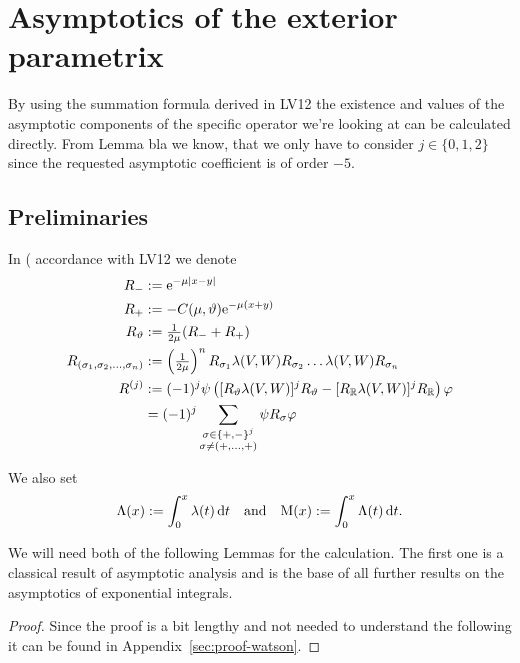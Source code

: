 \section{Asymptotics of the exterior parametrix}
By using the summation formula derived in LV12 the existence and values of the
asymptotic components of the specific operator we're looking at can be
calculated directly. From Lemma bla we know, that we only have to consider $j\in
\{0, 1, 2\}$ since the requested asymptotic coefficient is of order $-5$.

\subsection{Preliminaries}
In (%
accordance with LV12 we denote
\begin{align*}
    R_- &:= \Eto{-\mu\left|x-y\right|} \\
    R_+ &:= -C(\mu,\theta)\Eto{-\mu(x+y)} \\
    R_\theta &:= \tfrac1{2\mu} (R_- + R_+) \\
    R_{(\sigma_1,\sigma_2,\ldots,\sigma_n)} &:= 
    \left(\tfrac1{2\mu}\right)^n R_{\sigma_1} \lambda(V,W) R_{\sigma_2} \dots
    \lambda(V,W) R_{\sigma_n} \\
    R^{(j)} &:= (-1)^j \psi \left( [R_\theta \lambda(V,W)]^j R_\theta -
    [R_\mathbb{R}\lambda(V,W)]^j R_\mathbb{R}\right) \phi \\
            &= (-1)^j
                \sum_{
                        \substack{
                         \sigma\in\{+,-\}^j \\
                         \sigma\neq(+,\ldots,+)
                         }
                        }
                     \psi R_\sigma
                \phi
\end{align*}

We also set
\begin{align}
    \Lambda(x) := \Integ[x]{0}{t}{\lambda(t)}\quad\text{and}\quad
    \mathrm M(x) := \Integ[x]{0}{t}{\Lambda(t)}.
\end{align}

We will need both of the following Lemmas for the calculation. The first one is
a classical result of asymptotic analysis and is the base of all further results
on the asymptotics of exponential integrals.
\begin{Lemma}[Watson]
    
    \begin{proof}
        Since the proof is a bit lengthy and not needed to understand the
        following it can be found in Appendix~\ref{sec:proof-watson}.
    \end{proof}
\end{Lemma}

